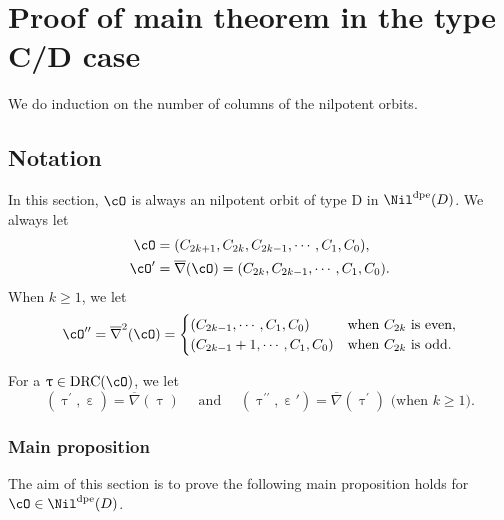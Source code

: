 \documentclass[12pt,a4paper]{amsart}
\def\eDD{\overline{\nabla}}
\numberwithin{equation}{section}
\theoremstyle{remark}
\def\dpeNil{\Nil^{\mathrm{dpe}}}
\def\bsign{{}^b\mathrm{Sign}}
\def\drc{\mathrm{DRC}}
\def\cOp{\cO^{\prime}}
\def\cOpp{\cO^{\prime\prime}}
\def\uptaup{\uptau^{\prime}}
\def\uptaupp{\uptau^{\prime\prime}}
\begin{document}


\section{Proof of main theorem in the type C/D case}
We do induction on the number of columns of the nilpotent orbits.
\subsection{Notation}
In this section, $\cO$ is always an nilpotent orbit of type D in $\dpeNil(D)$.
We always let
\[
  \begin{split}
    \cO &= (C_{2k+1}, C_{2k}, C_{2k-1}, \cdots,C_{1},C_{0}),\\
    \cOp &=\eDD(\cO)=(C_{2k}, C_{2k-1},\cdots,C_{1},C_{0} ).
    \end{split}
\]
When  $k\geq 1$, we let
\[
    \cOpp  = \eDD^{2}(\cO) =
    \begin{cases}
      (C_{2k-1},\cdots,C_{1},C_{0} ) & \text{when  $C_{2k}$ is even},\\
      (C_{2k-1}+1,\cdots,C_{1},C_{0} ) & \text{when  $C_{2k}$ is odd}.\\
    \end{cases}
\]

For a $\uptau\in \drc(\cO)$, we let
\[
(\uptaup,\upepsilon)=\eDD(\uptau) \quad\text{ and }\quad
   (\uptaupp,\upepsilon')=\eDD(\uptaup) \text{ (when $k\geq 1$)}.
 \]

 \subsubsection{Main proposition}
The aim of this section is to prove the following main proposition holds for
$\cO\in \dpeNil(D)$.

\end{document}
